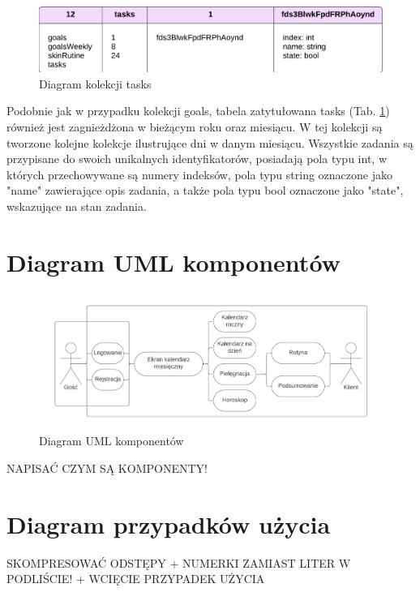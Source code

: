 \begin{figure}[h]
	\centering
	\includegraphics[width=1\linewidth]{images/model_danych/tasks}
	\caption{Diagram kolekcji tasks}
	\label{fig:tasks}
\end{figure}

Podobnie jak w przypadku kolekcji goals, tabela zatytułowana tasks (Tab. \ref{fig:tasks}) również jest zagnieżdżona w bieżącym roku oraz miesiącu. W tej kolekcji są tworzone kolejne kolekcje ilustrujące dni w danym miesiącu. Wszystkie zadania są przypisane do swoich unikalnych identyfikatorów, posiadają pola typu int, w których przechowywane są numery indeksów, pola typu string oznaczone jako "name" zawierające opis zadania, a także pola typu bool oznaczone jako "state", wskazujące na stan zadania.

\section{Diagram UML komponentów}

\begin{figure}[h]
	\centering
	\includegraphics[width=1\linewidth]{images/model_danych/uml}
	\caption{Diagram UML komponentów}
	\label{fig:uml}
\end{figure}

NAPISAĆ CZYM SĄ KOMPONENTY!

\section{Diagram przypadków użycia}

SKOMPRESOWAĆ ODSTĘPY + NUMERKI ZAMIAST LITER W PODLIŚCIE! + WCIĘCIE PRZYPADEK UŻYCIA

